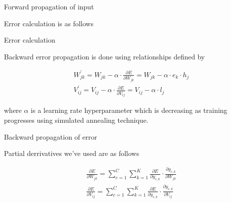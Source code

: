 \documentclass{article}
\newcommand{\SetAlgoStyle}{
	\SetAlgoNoLine
	\SetAlgoNoEnd
	\DontPrintSemicolon
}
\begin{document}
\begin{algorithm}[H]
	\SetAlgoStyle
	\caption{Forward propagation of input}
\end{algorithm}

Error calculation is as follows

\begin{algorithm}[H]
	\SetAlgoStyle
	\caption{Error calculation}
\end{algorithm}

Backward error propagation is done using relationships defined by

\begin{align}
	&W_{jk}^\prime = W_{jk} - \alpha \cdot \frac{\partial E}{\partial W_{jk}} =
	W_{jk} - \alpha \cdot e_k \cdot h_j \\
	&V_{ij}^\prime = V_{ij} - \alpha \cdot \frac{\partial E}{\partial V_{ij}} =
	V_{ij} - \alpha \cdot l_j
\end{align}

where $\alpha$ is a learning rate hyperparameter which is decreasing as
training progresses using simulated annealing technique.

\begin{algorithm}[H]
	\SetAlgoStyle
	\caption{Backward propagation of error}
\end{algorithm}

Partial derrivatives we've used are as follows

\begin{align}	
	&\frac{\partial E}{\partial W_{jk}} = \sum_{c=1}^C \sum_{k=1}^K
	\frac{\partial E}{\partial y_{c,k}} \cdot \frac{\partial y_{c,k}}{\partial
	W_{jk}} \\
	&\frac{\partial E}{\partial V_{ij}} = \sum_{c=1}^C \sum_{k=1}^K
	\frac{\partial E}{\partial y_{c,k}} \cdot \frac{\partial y_{c,k}}{\partial
	V_{ij}}
\end{align}
\end{document}
